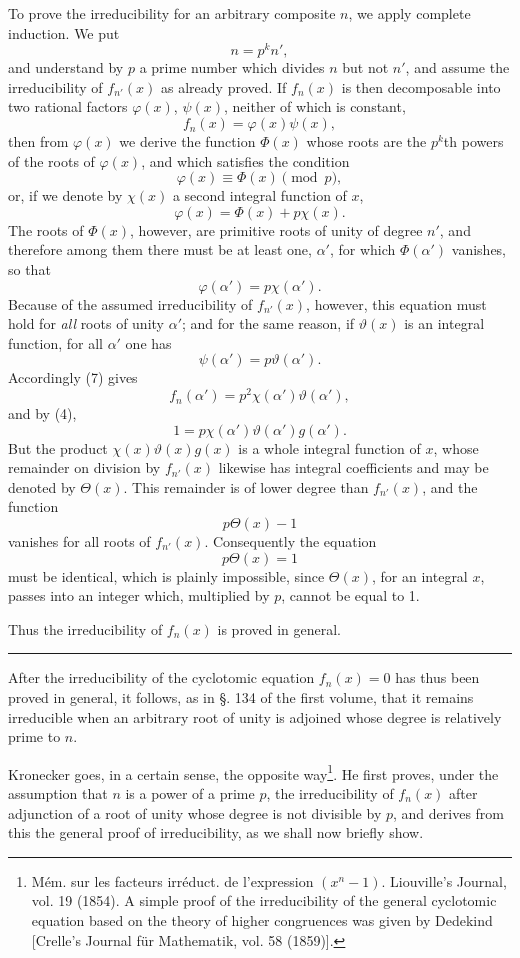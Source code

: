 \documentclass[11pt]{article}
\begin{document}
To prove the irreducibility for an arbitrary composite $n$, we apply complete induction. We put
\[
n=p^k n',
\]
and understand by $p$ a prime number which divides $n$ but not $n'$, and assume the irreducibility of $f_{n'}(x)$ as already proved. If $f_n(x)$ is then decomposable into two rational factors $\varphi(x)$, $\psi(x)$, neither of which is constant,
\begin{equation}\tag{7}
f_n(x)=\varphi(x)\psi(x),
\end{equation}
then from $\varphi(x)$ we derive the function $\Phi(x)$ whose roots are the $p^k$th powers of the roots of $\varphi(x)$, and which satisfies the condition
\[
\varphi(x)\equiv\Phi(x) \pmod p,
\]
or, if we denote by $\chi(x)$ a second integral function of $x$,
\[
\varphi(x)=\Phi(x)+p\chi(x).
\]
The roots of $\Phi(x)$, however, are primitive roots of unity of degree $n'$, and therefore among them there must be at least one, $\alpha'$, for which $\Phi(\alpha')$ vanishes, so that
\[
\varphi(\alpha')=p\chi(\alpha').
\]
Because of the assumed irreducibility of $f_{n'}(x)$, however, this equation must hold for \emph{all} roots of unity $\alpha'$; and for the same reason, if $\vartheta(x)$ is an integral function, for all $\alpha'$ one has
\[
\psi(\alpha')=p\vartheta(\alpha').
\]
Accordingly (7) gives
\[
f_n(\alpha')=p^2\chi(\alpha')\vartheta(\alpha'),
\]
and by (4),
\[
1=p\chi(\alpha')\vartheta(\alpha')g(\alpha').
\]
But the product $\chi(x)\vartheta(x)g(x)$ is a whole integral function of $x$, whose remainder on division by $f_{n'}(x)$ likewise has integral coefficients and may be denoted by $\Theta(x)$. This remainder is of lower degree than $f_{n'}(x)$, and the function
\[
p\Theta(x)-1
\]
vanishes for all roots of $f_{n'}(x)$. Consequently the equation
\[
p\Theta(x)=1
\]
must be identical, which is plainly impossible, since $\Theta(x)$, for an integral $x$, passes into an integer which, multiplied by $p$, cannot be equal to 1.

Thus the irreducibility of $f_n(x)$ is proved in general.

\medskip\hrule\medskip

After the irreducibility of the cyclotomic equation $f_n(x)=0$ has thus been proved in general, it follows, as in §. 134 of the first volume, that it remains irreducible when an arbitrary root of unity is adjoined whose degree is relatively prime to $n$.

Kronecker goes, in a certain sense, the opposite way\footnote{Mém. sur les facteurs irréduct. de l'expression $(x^n-1)$. Liouville's Journal, vol. 19 (1854). A simple proof of the irreducibility of the general cyclotomic equation based on the theory of higher congruences was given by Dedekind [Crelle's Journal für Mathematik, vol. 58 (1859)].}. He first proves, under the assumption that $n$ is a power of a prime $p$, the irreducibility of $f_n(x)$ after adjunction of a root of unity whose degree is not divisible by $p$, and derives from this the general proof of irreducibility, as we shall now briefly show.
\end{document}

